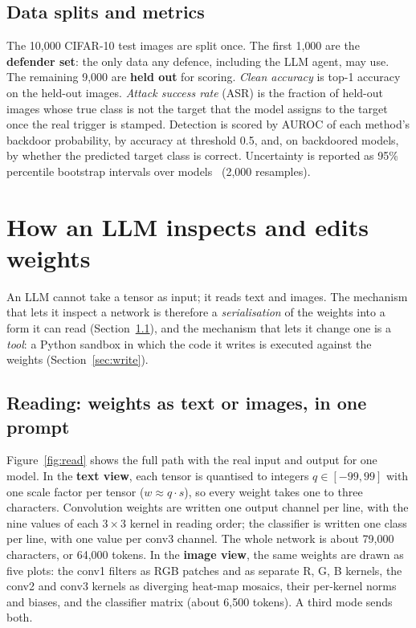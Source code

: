 \documentclass[11pt]{article}
\begin{document}
\subsection{Data splits and metrics}
The 10{,}000 CIFAR-10 test images are split once. The first 1{,}000 are the \textbf{defender set}:
the only data any defence, including the LLM agent, may use. The remaining 9{,}000 are
\textbf{held out} for scoring. \emph{Clean accuracy} is top-1 accuracy on the held-out images.
\emph{Attack success rate} (ASR) is the fraction of held-out images whose true class is not the target
that the model assigns to the target once the real trigger is stamped. Detection is scored by AUROC of
each method's backdoor probability, by accuracy at threshold 0.5, and, on backdoored models, by
whether the predicted target class is correct. Uncertainty is reported as 95\% percentile bootstrap
intervals over models~\citep{efron1979bootstrap} (2{,}000 resamples).

\section{How an LLM inspects and edits weights}
\label{sec:llm}
An LLM cannot take a tensor as input; it reads text and images. The mechanism that lets it inspect a
network is therefore a \emph{serialisation} of the weights into a form it can read
(Section~\ref{sec:read}), and the mechanism that lets it change one is a \emph{tool}: a Python
sandbox in which the code it writes is executed against the weights (Section~\ref{sec:write}).

\subsection{Reading: weights as text or images, in one prompt}
\label{sec:read}
Figure~\ref{fig:read} shows the full path with the real input and output for one model. In the
\textbf{text view}, each tensor is quantised to integers $q \in [-99, 99]$ with one scale factor per
tensor ($w \approx q \cdot s$), so every weight takes one to three characters. Convolution weights are
written one output channel per line, with the nine values of each $3{\times}3$ kernel in reading
order; the classifier is written one class per line, with one value per conv3 channel. The whole
network is about 79{,}000 characters, or 64{,}000 tokens. In the \textbf{image view}, the same weights
are drawn as five plots: the conv1 filters as RGB patches and as separate R, G, B kernels, the conv2
and conv3 kernels as diverging heat-map mosaics, their per-kernel norms and biases, and the classifier
matrix (about 6{,}500 tokens). A third mode sends both.
\end{document}
